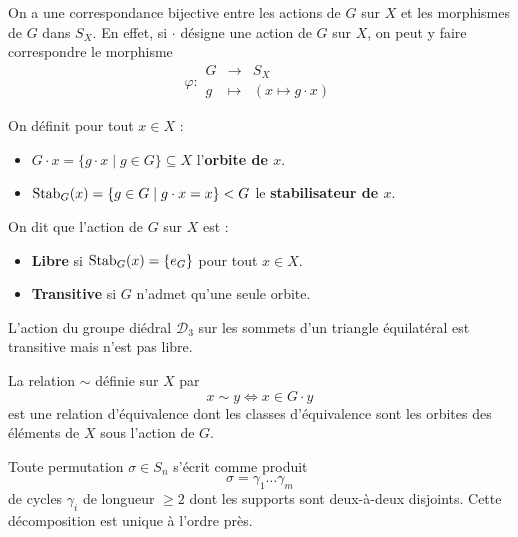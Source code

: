   \begin{theorem}
    On a une correspondance bijective entre les actions de $G$ sur $X$ et les morphismes de $G$ dans $S_X$. En effet, si $\cdot$ désigne une action de $G$ sur $X$, on peut y faire correspondre le morphisme
    \[ \varphi :
    \begin{array}{ccc}
      G &\rightarrow& S_X \\
      g &\mapsto& (x \mapsto g \cdot x)
    \end{array}
    \]
  \end{theorem}

  \begin{definition}
    On définit pour tout $x \in X$ :
    \begin{itemize}
      \item $G \cdot x = \{ g \cdot x \mid g \in G \} \subseteq X$ l'\textbf{orbite de $x$}.
      \item $\operatorname{Stab}_G(x) = \{ g \in G \mid g \cdot x = x \} < G$ le \textbf{stabilisateur de $x$}.
    \end{itemize}
    On dit que l'action de $G$ sur $X$ est :
    \begin{itemize}
      \item \textbf{Libre} si $\operatorname{Stab}_G(x) = \{ e_G \}$ pour tout $x \in X$.
      \item \textbf{Transitive} si $G$ n'admet qu'une seule orbite.
    \end{itemize}
  \end{definition}

  \begin{example}
    L'action du groupe diédral $\mathcal{D}_3$ sur les sommets d'un triangle équilatéral est transitive mais n'est pas libre.
  \end{example}

  \begin{proposition}
    \label{101-1}
    La relation $\sim$ définie sur $X$ par
    \[ x \sim y \iff x \in G \cdot y \]
    est une relation d'équivalence dont les classes d'équivalence sont les orbites des éléments de $X$ sous l'action de $G$.
  \end{proposition}


  \begin{application}
    Toute permutation $\sigma \in S_n$ s'écrit comme produit
    \[ \sigma = \gamma_1 \dots \gamma_m \]
    de cycles $\gamma_i$ de longueur $\geq 2$ dont les supports sont deux-à-deux disjoints. Cette décomposition est unique à l'ordre près.
  \end{application}

